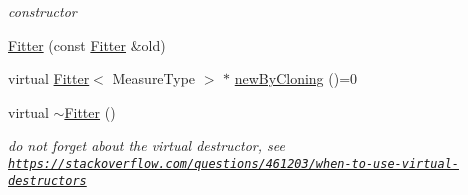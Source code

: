 \begin{DoxyCompactItemize}
\begin{DoxyCompactList}\small\item\em constructor \end{DoxyCompactList}\item 
\hyperlink{class_ox_1_1_fitter_ac51130b722159f88a0dad59877b76417}{Fitter} (const \hyperlink{class_ox_1_1_fitter}{Fitter} \&old)
\item 
virtual \hyperlink{class_ox_1_1_fitter}{Fitter}$<$ Measure\+Type $>$ $\ast$ \hyperlink{class_ox_1_1_fitter_a665ec51e52ed351c9ef801acc83fbdea}{new\+By\+Cloning} ()=0
\item 
virtual \hyperlink{class_ox_1_1_fitter_ab56eef37096f6f0687d83b8d15e00d43}{$\sim$\+Fitter} ()\hypertarget{class_ox_1_1_fitter_ab56eef37096f6f0687d83b8d15e00d43}{}\label{class_ox_1_1_fitter_ab56eef37096f6f0687d83b8d15e00d43}

\begin{DoxyCompactList}\small\item\em do not forget about the virtual destructor, see \href{https://stackoverflow.com/questions/461203/when-to-use-virtual-destructors}{\tt https\+://stackoverflow.\+com/questions/461203/when-\/to-\/use-\/virtual-\/destructors} \end{DoxyCompactList}\end{DoxyCompactItemize}
